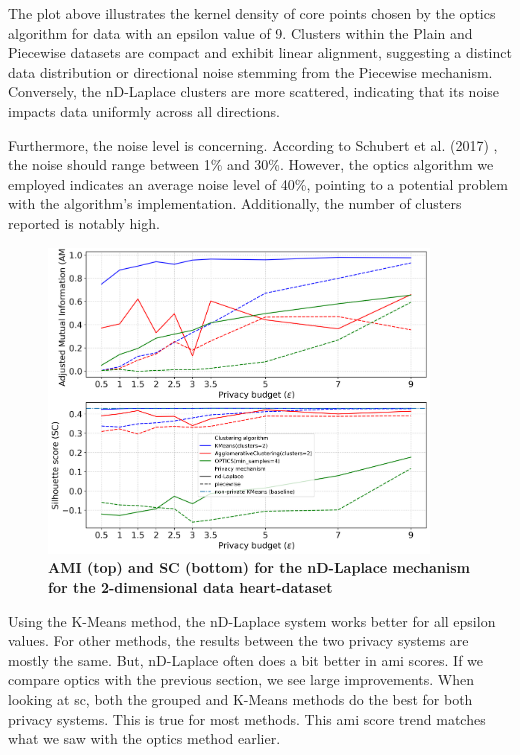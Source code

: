The plot above illustrates the kernel density of core points chosen by the \gls{optics} algorithm for data with an epsilon value of 9. Clusters within the Plain and Piecewise datasets are compact and exhibit linear alignment, suggesting a distinct data distribution or directional noise stemming from the Piecewise mechanism. Conversely, the nD-Laplace clusters are more scattered, indicating that its noise impacts data uniformly across all directions.

Furthermore, the noise level is concerning. According to Schubert et al. (2017) \citep{schubert_dbscan_2017}, the noise should range between 1\% and 30\%. However, the \gls{optics} algorithm we employed indicates an average noise level of 40\%, pointing to a potential problem with the algorithm's implementation. Additionally, the number of clusters reported is notably high.


\newpage
\begin{figure}[H]
  \centering
  \caption{\textbf{AMI (top) and SC (bottom) for the nD-Laplace mechanism for the 2-dimensional data heart-dataset}}
  \includegraphics[width=0.9\textwidth]{Results/nd-laplace/nd-Laplace/heart-dataset/ami-and-sc_2_dimensions.png}

  \label{fig:validation-heart-dataset_comparison_2d-laplace}
\end{figure}
Using the K-Means method, the nD-Laplace system works better for all epsilon values. For other methods, the results between the two privacy systems are mostly the same. But, nD-Laplace often does a bit better in \gls{ami} scores. If we compare \gls{optics} with the previous section, we see large improvements.
When looking at \gls{sc}, both the grouped and K-Means methods do the best for both privacy systems. This is true for most methods. This \gls{ami} score trend matches what we saw with the \gls{optics} method earlier.

